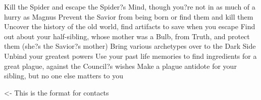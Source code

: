 \documentclass[char]{Silversiders}
\begin{document}
\name{\cPestilence{}}

Kill the Spider and escape the Spider?s Mind, though you?re not in as much of a hurry as Magnus
Prevent the Savior from being born or find them and kill them
Uncover the history of the old world, find artifacts to save when you escape
Find out about your half-sibling, whose mother was a Bulb, from Truth, and protect them (she?s the Savior?s mother)
Bring various archetypes over to the Dark Side
Unbind your greatest powers
Use your past life memories to find ingredients for a great plague, against the Council?s wishes
Make a plague antidote for your sibling, but no one else matters to you

\begin{itemz}[Goals]
	\item 
\end{itemz}

\begin{itemz}[Notes]
	\item 
\end{itemz}

\begin{contacts}
	\contact{\cTest{}} <- This is the format for contacts 
\end{contacts}
\end{document}
